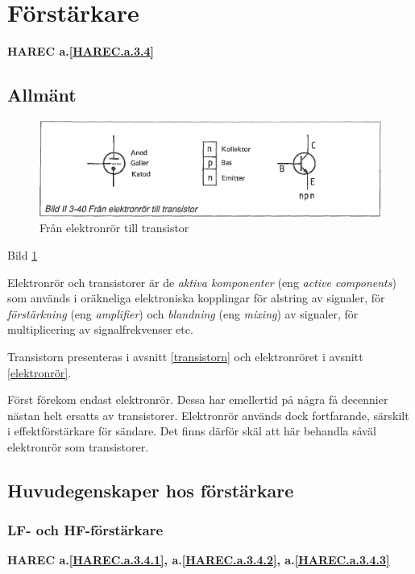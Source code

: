 \section{Förstärkare}
\textbf{HAREC a.\ref{HAREC.a.3.4}\label{myHAREC.a.3.4}}

\subsection{Allmänt}

\begin{figure}[h]
\begin{center}
\includegraphics[width=14cm]{images/bild_2_3-40}
\caption{Från elektronrör till transistor}
\label{fig:BildII3-40}
\end{center}
\end{figure}

Bild \ref{fig:BildII3-40}

Elektronrör och transistorer är de \emph{aktiva komponenter} (eng
\emph{active components}) som används i oräkneliga elektroniska kopplingar för
alstring av signaler, för \emph{förstärkning} (eng \emph{amplifier}) och
\emph{blandning} (eng \emph{mixing}) av signaler, för multiplicering av
signalfrekvenser etc. 

Transistorn presenteras i avsnitt \ref{transistorn} och elektronröret i avsnitt \ref{elektronrör}.

Först förekom endast elektronrör. Dessa har emellertid på några få
decennier nästan helt ersatts av transistorer. Elektronrör används
dock fortfarande, särskilt i effektförstärkare för sändare. Det finns
därför skäl att här behandla såväl elektronrör som transistorer.

\subsection{Huvudegenskaper hos förstärkare}
\subsubsection{LF- och HF-förstärkare}
\textbf{HAREC a.\ref{HAREC.a.3.4.1}, a.\ref{HAREC.a.3.4.2}, a.\ref{HAREC.a.3.4.3}\label{myHAREC.a.3.4.1}\label{myHAREC.a.3.4.2}\label{myHAREC.a.3.4.3}}

